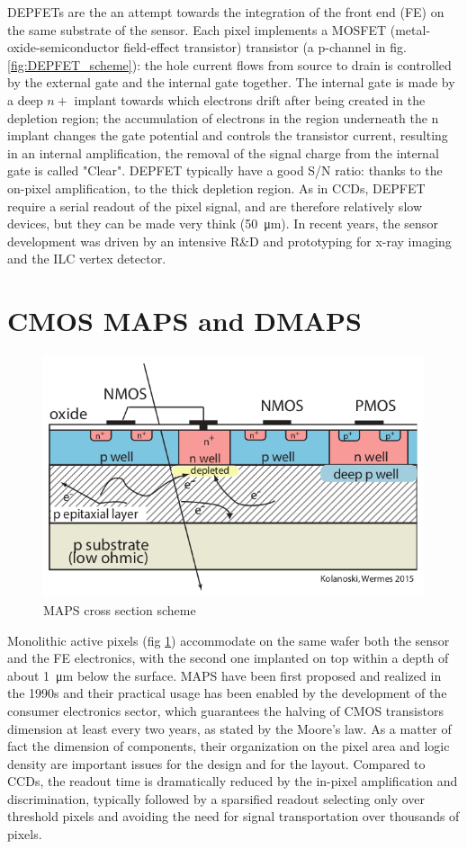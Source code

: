    DEPFETs are the an attempt towards the integration of the front end (FE) on the same substrate of the sensor.
   Each pixel implements a MOSFET (metal-oxide-semiconductor field-effect transistor) transistor (a p-channel in fig. \ref{fig:DEPFET_scheme}): the hole current flows from source to drain is controlled by the external gate and the internal gate together. The internal gate is made by a deep $n+$ implant towards which electrons drift after being created in the depletion region; the accumulation of electrons in the region underneath the n implant changes the gate potential and controls the transistor current, resulting in an internal amplification, the removal of the signal charge from the internal gate is called "Clear". 
   DEPFET typically have a good S/N ratio: thanks to the on-pixel amplification, to the thick depletion region. 
   As in CCDs, DEPFET require a serial readout of the pixel signal, and are therefore relatively slow devices, but they can be made very think (\SI{50}{\um}).
   In recent years, the sensor development was driven by an intensive R$\&$D and prototyping for x-ray imaging and the ILC vertex detector. 
   

\section{CMOS MAPS and DMAPS}\label{sec:MAPS_DMAPS}
   \begin{figure}[b]
      \centering
      \includegraphics[width=0.6\linewidth]{figures/Pixel_detectors/MAPS_scheme.png}  
      \caption{MAPS cross section scheme}
      \label{fig:MAPS_scheme}
   \end{figure}
   Monolithic active pixels (fig \ref{fig:MAPS_scheme}) accommodate on the same wafer both the sensor and the FE electronics, with the second one implanted on top within a depth of about \SI{1}{\um} below the surface. 
   MAPS have been first proposed and realized in the 1990s and their practical usage has been enabled by the development of the consumer electronics sector, which guarantees the halving of CMOS transistors dimension at least every two years, as stated by the Moore's law.
   As a matter of fact the dimension of components, their organization on the pixel area and logic density are important issues for the design and for the layout.
   Compared to CCDs, the readout time is dramatically reduced by the in-pixel amplification and discrimination, typically followed by a sparsified readout selecting only over threshold pixels and avoiding the need for signal transportation over thousands of pixels.

